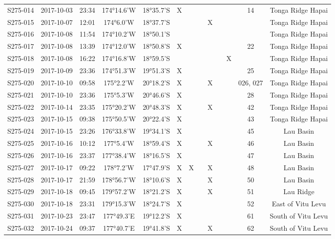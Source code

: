 \begin{longtable}{ccccccccccccc}
  S275-014 & 2017-10-03 & 23:34 & 174°14.6'W & 18°35.7'S & X &  &  &  &  &  & 14 & Tonga Ridge Hapai \\ 
  S275-015 & 2017-10-07 & 12:01 & 174°6.0'W & 18°37.7'S &  &  &  & X &  &  &  & Tonga Ridge Hapai  \\ 
  S275-016 & 2017-10-08 & 11:54 & 174°10.2'W & 18°50.1'S &  &  &  &  &  &  &  & Tonga Ridge Hapai  \\ 
  S275-017 & 2017-10-08 & 13:39 & 174°12.0'W & 18°50.8'S & X &  &  &  &  &  & 22 & Tonga Ridge Hapai  \\ 
  S275-018 & 2017-10-08 & 16:22 & 174°16.8'W & 18°59.5'S &  &  &  &  &  & X &  & Tonga Ridge Hapai  \\ 
  S275-019 & 2017-10-09 & 23:36 & 174°51.3'W & 19°51.3'S & X &  &  &  &  &  & 25 & Tonga Ridge Hapai  \\ 
  S275-020 & 2017-10-10 & 09:58 & 175°2.2'W & 20°18.2'S & X &  &  & X &  &  & 026, 027 & Tonga Ridge Hapai  \\ 
  S275-021 & 2017-10-10 & 23:36 & 175°5.3'W & 20°46.6'S & X &  &  &  &  &  & 28 & Tonga Ridge Hapai  \\ 
  S275-022 & 2017-10-14 & 23:35 & 175°20.2'W & 20°48.3'S & X &  &  & X &  &  & 42 & Tonga Ridge Hapai  \\ 
  S275-023 & 2017-10-15 & 09:38 & 175°50.5'W & 20°22.4'S & X &  &  &  &  &  & 43 & Tonga Ridge Hapai  \\ 
  S275-024 & 2017-10-15 & 23:26 & 176°33.8'W & 19°34.1'S & X &  &  &  &  &  & 45 & Lau Basin \\ 
  S275-025 & 2017-10-16 & 10:12 & 177°5.4'W & 18°59.4'S & X &  &  & X &  &  & 46 & Lau Basin \\ 
  S275-026 & 2017-10-16 & 23:37 & 177°38.4'W & 18°16.5'S & X &  &  &  &  &  & 47 & Lau Basin \\ 
  S275-027 & 2017-10-17 & 09:22 & 178°7.2'W & 17°47.9'S & X & X &  & X &  &  & 48 & Lau Basin \\ 
  S275-028 & 2017-10-17 & 21:59 & 178°56.7'W & 18°10.6'S & X &  &  & X &  &  & 50 & Lau Basin \\ 
  S275-029 & 2017-10-18 & 09:45 & 179°57.2'W & 18°21.2'S & X &  &  & X &  &  & 51 & Lau Ridge \\ 
  S275-030 & 2017-10-18 & 23:31 & 179°15.3'W & 18°24.7'S & X &  &  &  &  &  & 52 & East of Vitu Levu  \\ 
  S275-031 & 2017-10-23 & 23:47 & 177°49.3'E & 19°12.2'S & X &  &  &  &  &  & 61 & South of Vitu Levu  \\ 
  S275-032 & 2017-10-24 & 09:37 & 177°40.7'E & 19°41.8'S & X &  &  & X &  &  & 62 & South of Vitu Levu  \\ 

\end{longtable}

